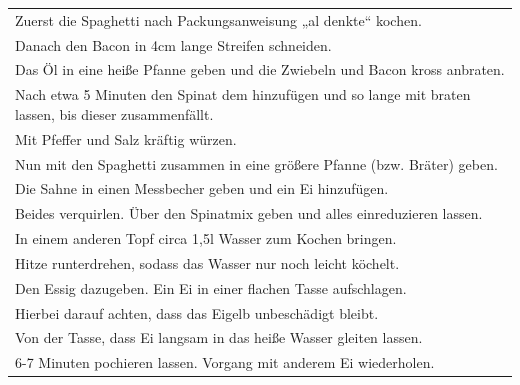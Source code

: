 \begin{tabular}{p{15cm}}
	\\
  Zuerst die Spaghetti nach Packungsanweisung „al denkte“ kochen.\\
  Danach den Bacon in 4cm lange Streifen schneiden.\\
  Das Öl in eine heiße Pfanne geben und die Zwiebeln und Bacon kross anbraten.\\
  Nach etwa 5 Minuten den Spinat dem hinzufügen und so lange mit braten lassen, bis dieser zusammenfällt.\\
  Mit Pfeffer und Salz kräftig würzen.\\
  Nun mit den Spaghetti zusammen in eine größere Pfanne (bzw. Bräter) geben.\\
  Die Sahne in einen Messbecher geben und ein Ei hinzufügen.\\
  Beides verquirlen. Über den Spinatmix geben und alles einreduzieren lassen.\\
  In einem anderen Topf circa 1,5l Wasser zum Kochen bringen.\\
  Hitze runterdrehen, sodass das Wasser nur noch leicht köchelt.\\
  Den Essig dazugeben. Ein Ei in einer flachen Tasse aufschlagen.\\
  Hierbei darauf achten, dass das Eigelb unbeschädigt bleibt.\\
  Von der Tasse, dass Ei langsam in das heiße Wasser gleiten lassen.\\
  6-7 Minuten pochieren lassen. Vorgang mit anderem Ei wiederholen.
\end{tabular}
